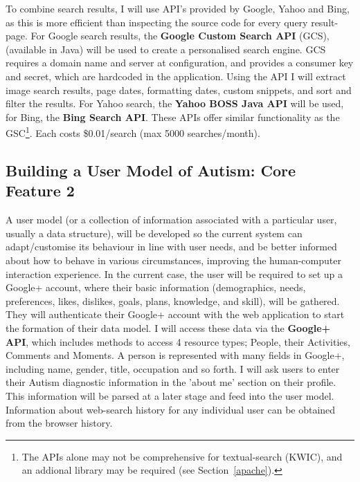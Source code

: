 \documentclass[a4paper, 10pt]{article}
\begin{document}
To combine search results, I will use API’s provided by Google, Yahoo and Bing, as this is more efficient than inspecting the source code for every query result-page. For Google search results, the \textbf{Google Custom Search API} (GCS), (available in Java) will be used to create a personalised search engine. GCS requires a domain name and server at configuration, and provides a consumer key and secret, which are hardcoded in the application. Using the API I will extract image search results, page dates, formatting dates, custom snippets, and sort and filter the results. For Yahoo search, the \textbf{Yahoo BOSS Java API} will be used, for Bing, the \textbf{Bing Search API}. These APIs offer similar functionality as the GSC\footnote{The APIs alone may not be comprehensive for textual-search (KWIC), and an addional library may be required (see Section~\ref{apache}).}. Each costs \$0.01/search (max 5000 searches/month).

\subsection {Building a User Model of Autism: Core Feature 2}\label{usermodel}
A user model (or a collection of information associated with a particular user, usually a data structure), will be developed so the current system can adapt/customise its behaviour in line with user needs, and be better informed about how to behave in various circumstances, improving the human-computer interaction experience. In the current case, the user will be required to set up a Google+ account, where their basic information (demographics, needs, preferences, likes, dislikes, goals, plans, knowledge, and skill), will be gathered. They will authenticate their Google+ account with the web application to start the formation of their data model. I will access these data via the \textbf{Google+ API}, which includes methods to access 4 resource  types; People, their Activities, Comments and Moments. A person is represented with many fields in Google+, including name, gender, title, occupation and so forth. I will ask users to enter their Autism diagnostic information in the 'about me' section on their profile. This information will be parsed at a later stage and feed into the user model. Information about web-search history for any individual user can be obtained from the browser history. 
\end{document}
